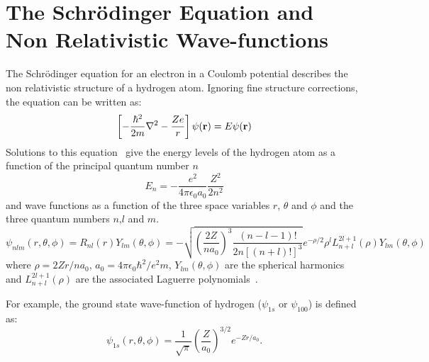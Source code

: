 \section{The Schr\"odinger Equation and Non Relativistic Wave-functions}
    The Schr\"odinger equation for an electron in a Coulomb potential describes
    the non relativistic structure of a hydrogen atom.
    Ignoring fine structure corrections, the equation can be written as:
    \begin{equation}
        \left[
            -\frac{\hbar^2}{2m} \nabla^2 - \frac{Ze}{r}
        \right] \psi(\mathbf{r}) = E \psi(\mathbf{r})
    \end{equation}
    Solutions to this equation~\cite{Bransden-Joachain} give the energy levels 
    of the hydrogen atom as a function of the principal quantum number $n$
    \begin{equation}
        E_n = - \frac{e^2}{4\pi\epsilon_0 a_0} \frac{Z^2}{2n^2}
    \end{equation}
    and wave functions as a function of the three space variables
    $r$, $\theta$ and $\phi$ and the three quantum numbers $n$,$l$ and $m$.
    \begin{equation}
        \psi_{nlm}(r,\theta,\phi) = R_{nl}(r) Y_{lm}(\theta,\phi)
        =
        - \sqrt{
            \left(
                \frac{2Z}{n a_0}
            \right)^3
            \frac{(n - l - 1)!}{2n [(n+l)!]^3}
        }
        e^{-\rho/2} \rho^l L^{2l+1}_{n+l}(\rho) Y_{lm}(\theta,\phi)
    \end{equation}
    where $\rho = 2Zr/na_0$, $a_0 = 4\pi\epsilon_0\hbar^2 / e^2 m$,
    $Y_{lm}(\theta,\phi)$ are the spherical harmonics and 
    $L^{2l+1}_{n+l}(\rho)$ are the associated Laguerre
    polynomials~\cite{Bransden-Joachain}.

    For example, the ground state wave-function of hydrogen 
    ($\psi_{1s}$ or $\psi_{100}$) is defined as:
   	\begin{equation} \label{eq:schrodinger-ground}
		\psi_{1s}(r,\theta,\phi) = \frac{1}{\sqrt{\pi}}
								   \left( \frac{Z}{a_0} \right)^{3/2}
								   e^{-Zr/a_0} .
	\end{equation}

